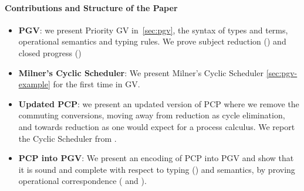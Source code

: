 \documentclass[main.tex]{subfiles}
\begin{document}
\paragraph*{Contributions and Structure of the Paper}
\begin{itemize}
\item \textbf{PGV}: we present Priority GV in~\cref{sec:pgv}, the syntax of types and terms, operational semantics and typing rules. We prove subject reduction () and closed progress ()
\item \textbf{Milner's Cyclic Scheduler}: We present Milner's Cyclic Scheduler \cite{milner89} \cref{sec:pgv-example} for the first time in GV.
\item \textbf{Updated PCP}: we present an updated version of PCP \cite{dardhagay18} where we remove the commuting conversions, moving away from reduction as cycle elimination, and towards reduction as one would expect for a process calculus. We report the Cyclic Scheduler from \cite{dardhagay18}.
\item \textbf{PCP into PGV}: We present an encoding of PCP into PGV and show that it is sound and complete with respect to typing () and semantics, by proving operational correspondence ( and ).
\end{itemize}
\end{document}
